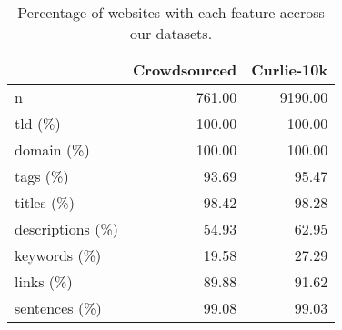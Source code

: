 \begin{table}[!ht]
\centering
\caption{Percentage of websites with each feature accross our datasets.}
\label{tab:feature-info}
\begin{tabular}{lrr}
\toprule
 & Crowdsourced & Curlie-10k \\
\midrule
n & 761.00 & 9190.00 \\
tld (\%) & 100.00 & 100.00 \\
domain (\%) & 100.00 & 100.00 \\
tags (\%) & 93.69 & 95.47 \\
titles (\%) & 98.42 & 98.28 \\
descriptions (\%) & 54.93 & 62.95 \\
keywords (\%) & 19.58 & 27.29 \\
links (\%) & 89.88 & 91.62 \\
sentences (\%) & 99.08 & 99.03 \\
\bottomrule
\end{tabular}
\end{table}
